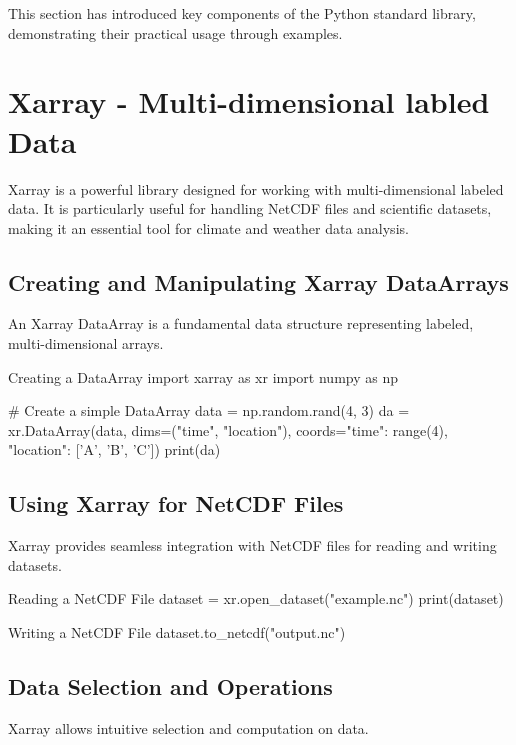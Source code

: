 This section has introduced key components of the Python standard library, demonstrating their practical usage through examples.


%
\section{Xarray - Multi-dimensional labled Data}
Xarray is a powerful library designed for working with multi-dimensional labeled data. It is particularly useful for handling NetCDF files and scientific datasets, making it an essential tool for climate and weather data analysis.

\subsection{Creating and Manipulating Xarray DataArrays}
An Xarray DataArray is a fundamental data structure representing labeled, multi-dimensional arrays.

\begin{codeonly}{Creating a DataArray}
import xarray as xr
import numpy as np

# Create a simple DataArray
data = np.random.rand(4, 3)
da = xr.DataArray(data, dims=("time", "location"), coords={"time": range(4), "location": ['A', 'B', 'C']})
print(da)
\end{codeonly}

\subsection{Using Xarray for NetCDF Files}
Xarray provides seamless integration with NetCDF files for reading and writing datasets.

\begin{codeonly}{Reading a NetCDF File}
dataset = xr.open_dataset("example.nc")
print(dataset)
\end{codeonly}

\begin{codeonly}{Writing a NetCDF File}
dataset.to_netcdf("output.nc")
\end{codeonly}

\subsection{Data Selection and Operations}
Xarray allows intuitive selection and computation on data.

